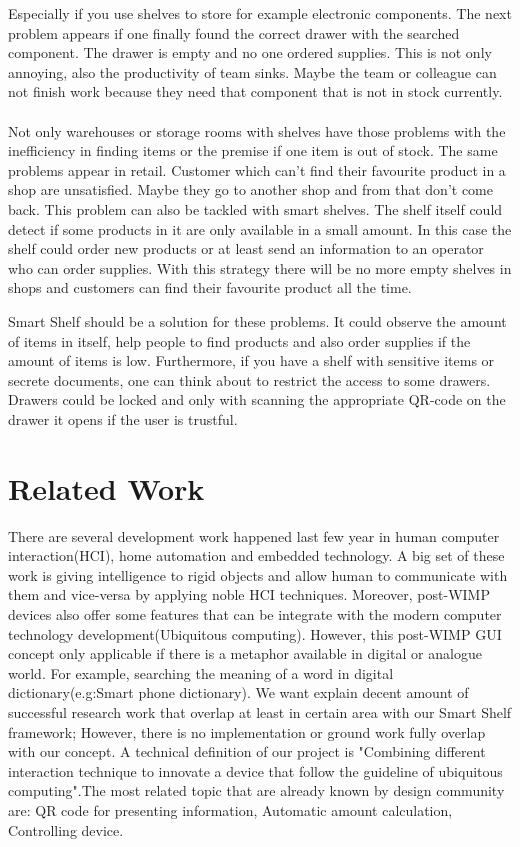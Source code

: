 \documentclass{sigchi}
\begin{document}
Especially if you use shelves to store for example electronic components. 
The next problem appears if one finally found the correct drawer with the searched component. 
The drawer is empty and no one ordered supplies. 
This is not only annoying, also the productivity of team sinks. 
Maybe the team or colleague can not finish work because they need that component that is not in stock currently. 
\\
\\
Not only warehouses or storage rooms with shelves have those problems with the inefficiency in finding items or the premise if one item is out of stock. 
The same problems appear in retail. 
Customer which can't find their favourite product in a shop are unsatisfied. 
Maybe they go to another shop and from that don't come back. 
This problem can also be tackled with smart shelves. 
The shelf itself could detect if some products in it are only available in a small amount. 
In this case the shelf could order new products or at least send an information to an operator who can order supplies. 
With this strategy there will be no more empty shelves in shops and customers can find their favourite product all the time. 

Smart Shelf should be a solution for these problems. 
It could observe the amount of items in itself, help people to find products and also order supplies if the amount of items is low. 
Furthermore, if you have a shelf with sensitive items or secrete documents, one can think about to restrict the access to some drawers. 
Drawers could be locked and only with scanning the appropriate QR-code on the drawer it opens if the user is trustful. 


\section{Related Work}

There are several development work happened last few year in human computer interaction(HCI), home automation and embedded technology. A big set of these work is giving intelligence to rigid objects and allow human to communicate with them and vice-versa by applying noble HCI techniques. Moreover, post-WIMP devices also offer some features that can be integrate with the modern computer technology development(Ubiquitous computing). However, this post-WIMP GUI concept only applicable if there is a metaphor available in digital or analogue world. For example, searching the meaning of a word in digital dictionary(e.g:Smart phone dictionary). We want explain decent amount of successful research work that overlap at least in certain area with our Smart Shelf framework; However, there is no implementation or ground work fully overlap with our concept. A technical definition of our project is "Combining different interaction technique to innovate a device that follow the guideline of ubiquitous computing".The most related topic that are already known by design community are: QR code for presenting information, Automatic amount calculation, Controlling device.    
\end{document}
